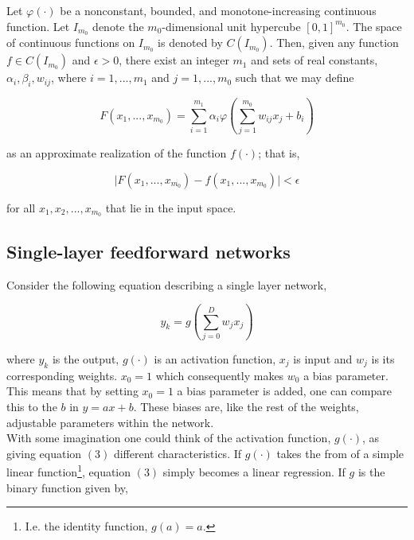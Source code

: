 \documentclass[12pt, letterpaper]{amsart}%
\begin{document}
\begin{mydef}
Let $\varphi (\cdot)$ be a nonconstant, bounded, and monotone-increasing continuous function. Let $I_{m_0}$ denote the $m_0$-dimensional unit hypercube $[0,1]^{m_0}$. The space of continuous functions on $I_{m_0}$ is denoted by $C(I_{m_0})$. Then, given any function $f \in C(I_{m_0})$ and $\epsilon > 0$, there exist an integer $m_1$ and sets of real constants, $\alpha_i, \beta_i, w_{ij}$, where $i = 1, ...,m_1$ and $j = 1, ...,m_0$ such that we may define

\begin{equation}
    F(x_1, ..., x_{m_0}) = \sum_{i=1}^{m_1} \alpha_i \varphi \left( \sum_{j=1}^{m_0} w_{ij} x_j + b_i \right)
\end{equation}

as an approximate realization of the function $f(\cdot)$; that is,

\begin{equation}
    \vert F(x_1, ..., x_{m_0}) - f(x_1, ..., x_{m_0}) \vert < \epsilon
\end{equation}

for all $x_1, x_2, ..., x_{m_0}$ that lie in the input space.

\end{mydef}

\subsection{Single-layer feedforward networks}
Consider the following equation describing a single layer network,

\begin{equation}
y_k = g \left( \sum_{j=0}^D w_j x_j \right)
\end{equation}

where $y_k$ is the output, $g(\cdot)$ is an activation function, $x_j$ is input and $w_j$ is its corresponding weights. $x_0 = 1$ which consequently makes $w_0$ a bias parameter. This means that by setting $x_0=1$ a bias parameter is added, one can compare this to the $b$ in $y = ax + b$. These biases are, like the rest of the weights, adjustable parameters within the network.
\\

With some imagination one could think of the activation function, $g(\cdot)$, as giving equation $(3)$ different characteristics. If $g(\cdot)$ takes the from of a simple linear function\footnote{I.e. the identity function, $g(a)=a$.}, equation $(3)$ simply becomes a linear regression. If $g$ is the binary function given by,
\end{document}
